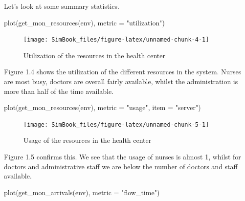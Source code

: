 \documentclass[
]{book}
\newenvironment{Shaded}{\begin{snugshade}}{\end{snugshade}}
\newcommand{\AttributeTok}[1]{\textcolor[rgb]{0.77,0.63,0.00}{#1}}
\newcommand{\FunctionTok}[1]{\textcolor[rgb]{0.00,0.00,0.00}{#1}}
\newcommand{\NormalTok}[1]{#1}
\newcommand{\StringTok}[1]{\textcolor[rgb]{0.31,0.60,0.02}{#1}}
\begin{document}
Let's look at some summary statistics.

\begin{Shaded}
\begin{Highlighting}[]
\FunctionTok{plot}\NormalTok{(}\FunctionTok{get\_mon\_resources}\NormalTok{(env), }\AttributeTok{metric =} \StringTok{"utilization"}\NormalTok{)}
\end{Highlighting}
\end{Shaded}

\begin{figure}

{\centering \texttt{[image: SimBook\_files/figure-latex/unnamed-chunk-4-1]} 

}

\caption{Utilization of the resources in the health center}\label{fig:unnamed-chunk-4}
\end{figure}

Figure 1.4 shows the utilization of the different resources in the system. Nurses are most busy, doctors are overall fairly available, whilst the administration is more than half of the time available.

\begin{Shaded}
\begin{Highlighting}[]
\FunctionTok{plot}\NormalTok{(}\FunctionTok{get\_mon\_resources}\NormalTok{(env), }\AttributeTok{metric =} \StringTok{"usage"}\NormalTok{, }\AttributeTok{item =} \StringTok{"server"}\NormalTok{)}
\end{Highlighting}
\end{Shaded}

\begin{figure}

{\centering \texttt{[image: SimBook\_files/figure-latex/unnamed-chunk-5-1]} 

}

\caption{Usage of the resources in the health center}\label{fig:unnamed-chunk-5}
\end{figure}

Figure 1.5 confirms this. We see that the usage of nurses is almost 1, whilst for doctors and administrative staff we are below the number of doctors and staff available.

\begin{Shaded}
\begin{Highlighting}[]
\FunctionTok{plot}\NormalTok{(}\FunctionTok{get\_mon\_arrivals}\NormalTok{(env), }\AttributeTok{metric =} \StringTok{"flow\_time"}\NormalTok{)}
\end{Highlighting}
\end{Shaded}
\end{document}
